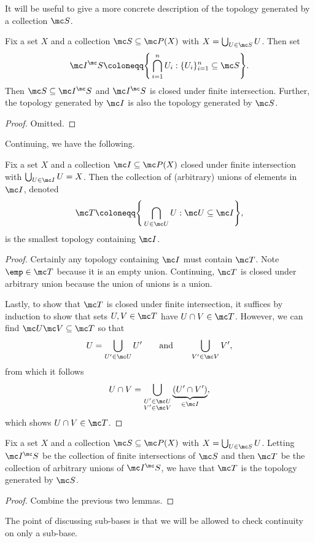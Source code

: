 \documentclass[../notes.tex]{subfiles}
\begin{document}
It will be useful to give a more concrete description of the topology generated by a collection $\mc S$.
\begin{lemma}
	Fix a set $X$ and a collection $\mc S\subseteq\mc P(X)$ with $X=\bigcup_{U\in\mc S}U$. Then set
	\[\mc I^\mc S\coloneqq\Bigg\{\bigcap_{i=1}^nU_i:\{U_i\}_{i=1}^n\subseteq\mc S\Bigg\}.\]
	Then $\mc S\subseteq\mc I^\mc S$ and $\mc I^\mc S$ is closed under finite intersection. Further, the topology generated by $\mc I$ is also the topology generated by $\mc S$.
\end{lemma}
\begin{proof}
	Omitted.
\end{proof}
Continuing, we have the following.
\begin{lemma} \label{cor:takearbunion}
	Fix a set $X$ and a collection $\mc I\subseteq\mc P(X)$ closed under finite intersection with $\bigcup_{U\in\mc I}U=X$. Then the collection of (arbitrary) unions of elements in $\mc I$, denoted
	\[\mc T\coloneqq\Bigg\{\bigcap_{U\in\mc U}U:\mc U\subseteq\mc I\Bigg\},\]
	is the smallest topology containing $\mc I$.
\end{lemma}
\begin{proof}
	Certainly any topology containing $\mc I$ must contain $\mc T$. Note $\emp\in\mc T$ because it is an empty union. Continuing, $\mc T$ is closed under arbitrary union because the union of unions is a union.

	Lastly, to show that $\mc T$ is closed under finite intersection, it suffices by induction to show that sets $U,V\in\mc T$ have $U\cap V\in\mc T$. However, we can find $\mc U\mc V\subseteq\mc T$ so that
	\[U=\bigcup_{U'\in\mc U}U'\qquad\text{and}\qquad\bigcup_{V'\in\mc V}V',\]
	from which it follows
	\[U\cap V=\bigcup_{\substack{U'\in\mc U\\V'\in\mc V}}\underbrace{(U'\cap V')}_{\in\mc I},\]
	which shows $U\cap V\in\mc T$.
\end{proof}
\begin{corollary}
	Fix a set $X$ and a collection $\mc S\subseteq\mc P(X)$ with $X=\bigcup_{U\in\mc S}U$. Letting $\mc I^\mc S$ be the collection of finite intersections of $\mc S$ and then $\mc T$ be the collection of arbitrary unions of $\mc I^\mc S$, we have that $\mc T$ is the topology generated by $\mc S$.
\end{corollary}
\begin{proof}
	Combine the previous two lemmas.
\end{proof}
\begin{remark} \label{rem:checkcontinuity}
	The point of discussing sub-bases is that we will be allowed to check continuity on only a sub-base.
\end{remark}
\end{document}
